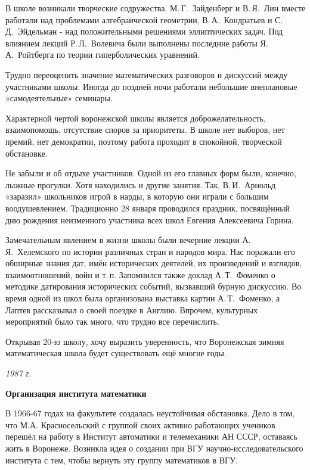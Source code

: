 В школе возникали творческие содружества.
М.\,Г.~Зай\-ден\-берг и В.\,Я.~Лин вместе работали над проблемами алгебраической геометрии, В.\,А.~Кондратьев и С.\,Д.~Эйдельман - над положительными решениями эллиптических задач. Под влиянием лекций Р.\,Л.~Волевича были выполнены последние работы Я.\,А.~Ройтберга по теории гиперболических уравнений.

Трудно переоценить значение математических разговоров и дискуссий между участниками школы.
Иногда до поз\-д\-ней ночи работали небольшие внеплановые «самодеятельные» семинары.

Характерной чертой воронежской школы является доброжелательность, взаимопомощь, отсутствие споров за приоритеты. В школе нет выборов, нет премий, нет демократии, поэтому работа проходит в спокойной, творческой обстановке.

Не забыли и об отдыхе участников. Одной из его главных форм были, конечно, лыжные прогулки. Хотя находились и другие занятия. Так, В.\,И.~Арнольд «заразил» школьников игрой в нарды, в которую они играли с большим воодушевлением. Традиционно 28 января проводился праздник, посвящённый дню рождения неизменного участника всех школ Евгения Алексеевича Горина.

Замечательным явлением в жизни школы были вечерние лекции А.\,Я.~Хелемского по истории различных стран и народов мира.
Нас поражали его обширные знания дат, имён исторических деятелей, их произведений и взглядов,
взаимоотношений, войн и т.\,п.
Запомнился также доклад А.\,Т.~Фоменко о методике датирования исторических событий, вызвавший бурную дискуссию.
Во время одной из школ была организована выставка картин А.\,Т.~Фоменко,
а Лаптев рассказывал о своей поездке в Англию. Впрочем, культурных мероприятий было так много, что трудно все перечислить.

Открывая 20-ю школу, хочу выразить уверенность, что Воронежская зимняя математическая школа будет существовать ещё многие годы.

\begin{flushright}
{\it 1987 г.}
\end{flushright}

{\bf Организация института математики}

В 1966-67 годах на факультете создалась неустойчивая обстановка. Дело в том, что М.А. Красносельский с группой своих активно работающих учеников перешёл на работу в Институт автоматики и телемеханики АН СССР, оставаясь жить в Воронеже. Возникла идея о создании при ВГУ научно-исследовательского института с тем, чтобы вернуть эту группу математиков в ВГУ.

